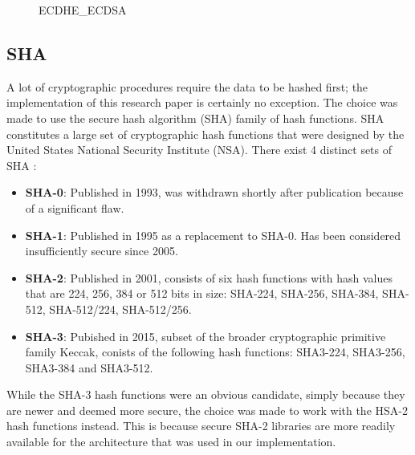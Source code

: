 \begin{figure}[h]
	\centering
	\caption{ECDHE\_ECDSA}
	\label{fig:ECDH2}
\end{figure} 

\subsection{SHA} 
\label{subsec:sha}

A lot of cryptographic procedures require the data to be hashed first; the implementation of this research paper is certainly no exception. The choice was made to use the secure hash algorithm (SHA) family of hash functions. SHA constitutes a large set of cryptographic hash functions that were designed by the United States National Security Institute (NSA). There exist 4 distinct sets of SHA \cite{wiki:SHA}:

\begin{itemize}
	\item \textbf{SHA-0}: Published in 1993, was withdrawn shortly after publication because of a significant flaw.
	
	\item \textbf{SHA-1}: Published in 1995 as a replacement to SHA-0. Has been considered insufficiently secure since 2005.
	
	\item \textbf{SHA-2}: Published in 2001, consists of six hash functions with hash values that are 224, 256, 384 or 512 bits in size: SHA-224, SHA-256, SHA-384, SHA-512, SHA-512/224, SHA-512/256.
	
	\item \textbf{SHA-3}: Pubished in 2015, subset of the broader cryptographic primitive family Keccak, conists of the following hash functions: SHA3-224, SHA3-256, SHA3-384 and SHA3-512.
\end{itemize} 
While the SHA-3 hash functions were an obvious candidate, simply because they are newer and deemed more secure, the choice was made to work with the HSA-2 hash functions instead. This is because secure SHA-2 libraries are more readily available for the architecture that was used in our implementation. 


